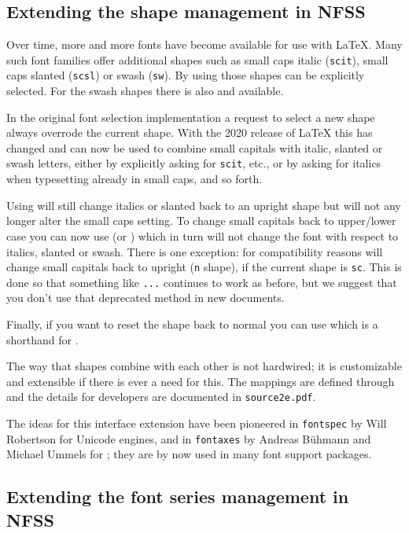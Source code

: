 \documentclass{ltnews}
\providecommand\file[1]{\texttt{#1}}
\providecommand\pkg[1]{\texttt{#1}}
\providecommand\pdfTeX{\hologo{pdfTeX}}
\begin{document}
\subsection{Extending the shape management in NFSS}

Over time, more and more fonts have become available for use with
\LaTeX{}. Many such font families offer additional shapes such as small
caps italic (\texttt{scit}), small caps slanted (\texttt{scsl}) or
swash (\texttt{sw}).
By using  those shapes can
be explicitly selected. For the swash shapes there is also
 and  available.

In the original font selection implementation a request to select a new shape
always overrode the current shape. With the 2020 release of \LaTeX{}
this has changed and  can now be used to combine small
capitals with italic, slanted or swash letters, either by explicitly
asking for \texttt{scit}, etc., or by asking for italics when typesetting
already in small caps, and so forth.

Using  will still change italics or slanted back to an
upright shape but will not any longer alter the small caps setting. To
change small capitals back to upper/lower case you can now use
 (or ) which in turn will not change the font
with respect to italics, slanted or swash.
%
There is one exception: for compatibility reasons  will
change small capitals back to upright (\texttt{n} shape), if the
current shape is \texttt{sc}. This is done so that something like
\allowbreak\texttt{...}\allowbreak{} continues
to work as before, but we suggest that you don't use that deprecated method in
new documents.


Finally, if you want to
reset the shape back to normal you can use  which is a
shorthand for .

The way that shapes combine with each other is not hardwired; it is
customizable and extensible if there is ever a need for this. The
mappings
are defined through  and the
details for developers are documented in \file{source2e.pdf}.

The ideas for this interface extension have been pioneered in
\pkg{fontspec} by Will Robertson for Unicode engines, and in
\pkg{fontaxes} by Andreas Bühmann and Michael Ummels for \pdfTeX{};
they are by now used in many font support packages.


\subsection{Extending the font series management in NFSS}
\end{document}
